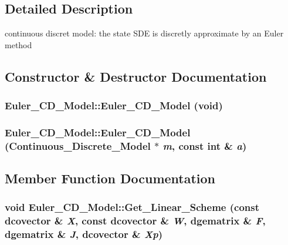 \subsection{Detailed Description}
continuous discret model: the state SDE is discretly approximate by an Euler method 

\subsection{Constructor \& Destructor Documentation}
\hypertarget{class_euler___c_d___model_10ce5994cf0e94c995e39984ca7d5839}{
\subsubsection[{Euler\_\-CD\_\-Model}]{\setlength{\rightskip}{0pt plus 5cm}Euler\_\-CD\_\-Model::Euler\_\-CD\_\-Model (void)}}
\label{class_euler___c_d___model_10ce5994cf0e94c995e39984ca7d5839}


\hypertarget{class_euler___c_d___model_ca92bef525ab4e38db0cdd66f1ad34fd}{
\subsubsection[{Euler\_\-CD\_\-Model}]{\setlength{\rightskip}{0pt plus 5cm}Euler\_\-CD\_\-Model::Euler\_\-CD\_\-Model ({\bf Continuous\_\-Discrete\_\-Model} $\ast$ {\em m}, \/  const int \& {\em a})}}
\label{class_euler___c_d___model_ca92bef525ab4e38db0cdd66f1ad34fd}




\subsection{Member Function Documentation}
\hypertarget{class_euler___c_d___model_e67b3130695db99e6057811914994aed}{
\subsubsection[{Get\_\-Linear\_\-Scheme}]{\setlength{\rightskip}{0pt plus 5cm}void Euler\_\-CD\_\-Model::Get\_\-Linear\_\-Scheme (const dcovector \& {\em X}, \/  const dcovector \& {\em W}, \/  dgematrix \& {\em F}, \/  dgematrix \& {\em J}, \/  dcovector \& {\em Xp})}}
\label{class_euler___c_d___model_e67b3130695db99e6057811914994aed}


